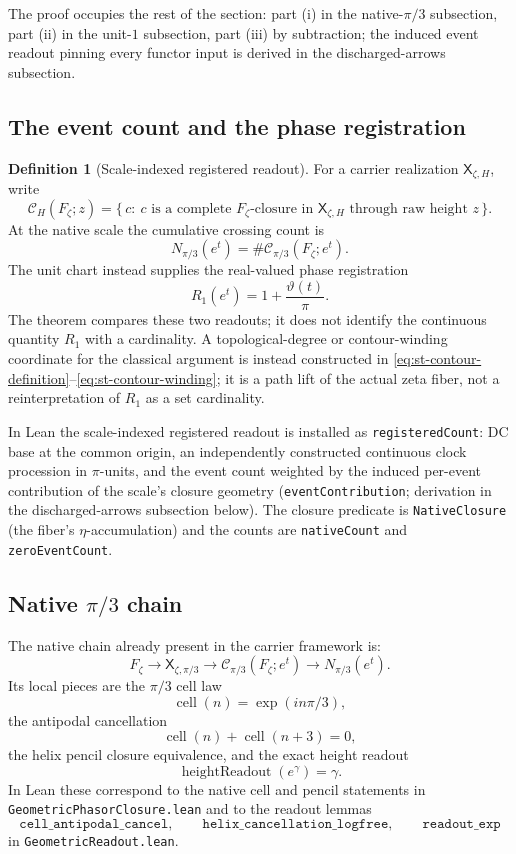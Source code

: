\documentclass[11pt]{article}
\theoremstyle{definition}
\newtheorem{definition}[theorem]{Definition}
\begin{document}
The proof occupies the rest of the section: part (i) in the native-\(\pi/3\)
subsection, part (ii) in the unit-\(1\) subsection, part (iii) by subtraction;
the induced event readout pinning every functor input is derived in the
discharged-arrows subsection.

\subsection{The event count and the phase registration}
\begin{definition}[Scale-indexed registered readout]\label{def:registered-count}
For a carrier realization \(\mathsf X_{\zeta,H}\), write
\[
\mathcal C_H(F_\zeta;z)
=
\{\,c:\ c\text{ is a complete }F_\zeta\text{-closure in }\mathsf X_{\zeta,H}
\text{ through raw height }z\,\}.
\]
At the native scale the cumulative crossing count is
\[
N_{\pi/3}(e^t)
 =
\#\mathcal C_{\pi/3}(F_\zeta;e^t).
\]
The unit chart instead supplies the real-valued phase registration
\[
R_1(e^t)=1+\frac{\vartheta(t)}{\pi}.
\]
The theorem compares these two readouts; it does not identify the continuous
quantity \(R_1\) with a cardinality.  A topological-degree or
contour-winding coordinate for the classical argument is instead constructed
in \eqref{eq:st-contour-definition}--\eqref{eq:st-contour-winding}; it is a
path lift of the actual zeta fiber, not a reinterpretation of \(R_1\) as a set
cardinality.
\end{definition}

In Lean the scale-indexed registered readout is installed as
\texttt{registeredCount}: DC base at the common origin, an independently
constructed continuous clock procession in \(\pi\)-units, and the event count
weighted by the induced per-event contribution of the scale's closure geometry
(\texttt{eventContribution}; derivation in the discharged-arrows subsection
below).  The closure predicate is
\texttt{NativeClosure} (the fiber's \(\eta\)-accumulation) and the counts are
\texttt{nativeCount} and \texttt{zeroEventCount}.

\subsection{Native \texorpdfstring{\(\pi/3\)}{pi/3} chain}
The native chain already present in the carrier framework is:
\[
F_\zeta
\longrightarrow
\mathsf X_{\zeta,\pi/3}
\longrightarrow
\mathcal C_{\pi/3}(F_\zeta;e^t)
\longrightarrow
N_{\pi/3}(e^t).
\]
Its local pieces are the \(\pi/3\) cell law
\[
\operatorname{cell}(n)=\exp(i n\pi/3),
\]
the antipodal cancellation
\[
\operatorname{cell}(n)+\operatorname{cell}(n+3)=0,
\]
the helix pencil closure equivalence, and the exact height readout
\[
\operatorname{heightReadout}(e^\gamma)=\gamma.
\]
In Lean these correspond to the native cell and pencil statements in
\texttt{GeometricPhasorClosure.lean} and to the readout lemmas
\[
\texttt{cell\_antipodal\_cancel},\qquad
\texttt{helix\_cancellation\_logfree},\qquad
\texttt{readout\_exp}
\]
in \texttt{GeometricReadout.lean}.
\end{document}
